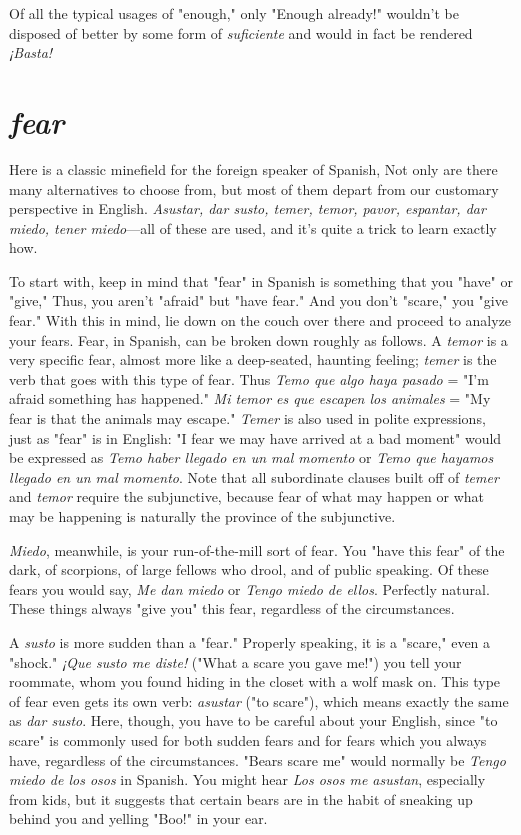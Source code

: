 Of all the typical usages of "enough," only "Enough already!"
wouldn't be disposed of better by some form of \emph{suficiente} and would in
fact be rendered \emph{¡Basta!}

\section{\emph{fear}}

Here is a classic minefield for the foreign speaker of Spanish,
Not only are there many alternatives to choose from, but most of them
depart from our customary perspective in English. \emph{Asustar, dar susto,
temer, temor, pavor, espantar, dar miedo, tener miedo}---all of these
are used, and it's quite a trick to learn exactly how.

To start with, keep in mind that "fear" in Spanish is something that you "have" or "give," Thus, you aren't "afraid" but "have
fear." And you don't "scare," you "give fear." With this in mind, lie
down on the couch over there and proceed to analyze your fears. Fear,
in Spanish, can be broken down roughly as follows. A \emph{temor} is a very
specific fear, almost more like a deep-seated, haunting feeling; \emph{temer}
is the verb that goes with this type of fear. Thus \emph{Temo que algo haya
pasado} = "I'm afraid something has happened." \emph{Mi temor es que escapen los animales} = "My fear is that the animals may escape." \emph{Temer}
is also used in polite expressions, just as "fear" is in English: "I fear we
may have arrived at a bad moment" would be expressed as \emph{Temo haber
llegado en un mal momento} or \emph{Temo que hayamos llegado en un mal
momento}. Note that all subordinate clauses built off of \emph{temer} and \emph{temor} require the subjunctive, because fear of what may happen or what
may be happening is naturally the province of the subjunctive.

\emph{Miedo}, meanwhile, is your run-of-the-mill sort of fear. You
"have this fear" of the dark, of scorpions, of large fellows who drool,
and of public speaking. Of these fears you would say, \emph{Me dan miedo}
or \emph{Tengo miedo de ellos}. Perfectly natural. These things always "give
you" this fear, regardless of the circumstances.

A \emph{susto} is more sudden than a "fear." Properly speaking, it is a
"scare," even a "shock." \emph{¡Que susto me diste!} ("What a scare you gave
me!") you tell your roommate, whom you found hiding in the closet
with a wolf mask on. This type of fear even gets its own verb: \emph{asustar}
("to scare"), which means exactly the same as \emph{dar susto}. Here, though,
you have to be careful about your English, since "to scare" is commonly used for both sudden fears and for fears which you always have,
regardless of the circumstances. "Bears scare me" would normally
be \emph{Tengo miedo de los osos} in Spanish. You might hear \emph{Los osos me
asustan}, especially from kids, but it suggests that certain bears are in
the habit of sneaking up behind you and yelling "Boo!" in your ear.

